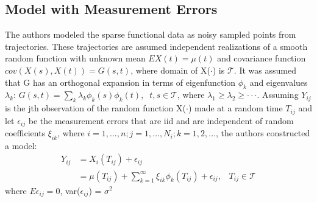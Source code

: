 \documentclass[11pt]{report}
\begin{document}
\subsection*{Model with Measurement Errors}
The authors modeled the sparse functional data as noisy sampled points from trajectories. 
These trajectories are assumed independent realizations of a smooth random function with unknown mean $E{X(t)} = \mu(t)$ and covariance function $cov(X(s), X(t)) = G(s,t)$, where domain of X($\cdot$) is $\mathcal{T}$.
It was assumed that G has an orthogonal expansion in terms of eigenfunction $\phi_k$ and eigenvalues $\lambda_k$: $G(s,t) = \sum_k{\lambda_k\phi_k(s)\phi_k(t)}, \; \; t, s \in \mathcal{T}$, where $\lambda_1 \geq \lambda_2 \geq \cdot \cdot \cdot$.
Assuming $Y_{ij}$ is the jth observation of the random function X($\cdot$) made at a random time $T_{ij}$ and let $\epsilon_{ij}$ be the measurement errors that are iid and are independent of random coefficients $\xi_{ik}$, where $i = 1, ..., n; j = 1, ..., N_i; k = 1, 2, ...$, the authors constructed a model: 
\begin{align}
	\label{eq:eq1}
	Y_{ij} &= X_i(T_{ij}) + \epsilon_{ij}  \\
	&= \mu(T_{ij}) + \sum_{k=1}^\infty \xi_{ik}\phi_k(T_{ij}) + \epsilon_{ij}, \; \; \;  T_{ij} \in \mathcal{T} 
\end{align}
where $E{\epsilon_{ij}} = 0$, var($\epsilon_{ij}$) = $\sigma^2$
\end{document}
